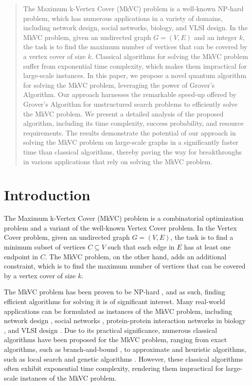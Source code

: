 \begin{abstract}
The Maximum k-Vertex Cover (MkVC) problem is a well-known NP-hard problem, which has numerous applications in a variety of domains, including network design, social networks, biology, and VLSI design. In the MkVC problem, given an undirected graph $G=(V, E)$ and an integer $k$, the task is to find the maximum number of vertices that can be covered by a vertex cover of size $k$. Classical algorithms for solving the MkVC problem suffer from exponential time complexity, which makes them impractical for large-scale instances. In this paper, we propose a novel quantum algorithm for solving the MkVC problem, leveraging the power of Grover's Algorithm. Our approach harnesses the remarkable speed-up offered by Grover's Algorithm for unstructured search problems to efficiently solve the MkVC problem. We present a detailed analysis of the proposed algorithm, including its time complexity, success probability, and resource requirements. The results demonstrate the potential of our approach in solving the MkVC problem on large-scale graphs in a significantly faster time than classical algorithms, thereby paving the way for breakthroughs in various applications that rely on solving the MkVC problem.
\end{abstract}

\section{Introduction}\label{sec:introduction}

The Maximum k-Vertex Cover (MkVC) problem is a combinatorial optimization problem and a variant of the well-known Vertex Cover problem. In the Vertex Cover problem, given an undirected graph $G=(V, E)$, the task is to find a minimum subset of vertices $C \subseteq V$ such that each edge in $E$ has at least one endpoint in $C$. The MkVC problem, on the other hand, adds an additional constraint, which is to find the maximum number of vertices that can be covered by a vertex cover of size $k$.

The MkVC problem has been proven to be NP-hard \cite{garey1979computers}, and as such, finding efficient algorithms for solving it is of significant interest. Many real-world applications can be formulated as instances of the MkVC problem, including network design \cite{network}, social networks \cite{social}, protein-protein interaction networks in biology \cite{biology}, and VLSI design \cite{VLSI}. Due to its practical significance, numerous classical algorithms have been proposed for the MkVC problem, ranging from exact algorithms, such as branch-and-bound \cite{branch}, to approximate and heuristic algorithms, such as local search \cite{local} and genetic algorithms \cite{genetic}. However, these classical algorithms often exhibit exponential time complexity, rendering them impractical for large-scale instances of the MkVC problem.

